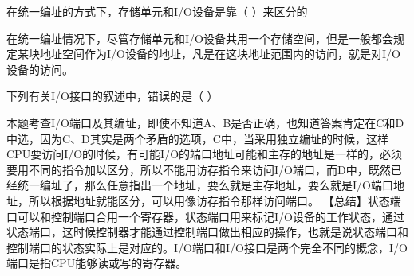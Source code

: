 \question 在统一编址的方式下，存储单元和I/O设备是靠（ ）来区分的
\par{}
\begin{solution}在统一编址情况下，尽管存储单元和I/O设备共用一个存储空间，但是一般都会规定某块地址空间作为I/O设备的地址，凡是在这块地址范围内的访问，就是对I/O设备的访问。
\end{solution}
\question 下列有关I/O接口的叙述中，错误的是（ ）
\par{}
\begin{solution}本题考查I/O端口及其编址，即使不知道A、B是否正确，也知道答案肯定在C和D中选，因为C、D其实是两个矛盾的选项，C中，当采用独立编址的时候，这样CPU要访问I/O的时候，有可能I/O的端口地址可能和主存的地址是一样的，必须要用不同的指令加以区分，所以不能用访存指令来访问I/O端口，而D中，既然已经统一编址了，那么任意指出一个地址，要么就是主存地址，要么就是I/O端口地址，所以根据地址就能区分，可以用像访存指令那样访问端口。
【总结】状态端口可以和控制端口合用一个寄存器，状态端口用来标记I/O设备的工作状态，通过状态端口，这时候控制器才能通过控制端口做出相应的操作，也就是说状态端口和控制端口的状态实际上是对应的。I/O端口和I/O接口是两个完全不同的概念，I/O端口是指CPU能够读或写的寄存器。
\end{solution}
